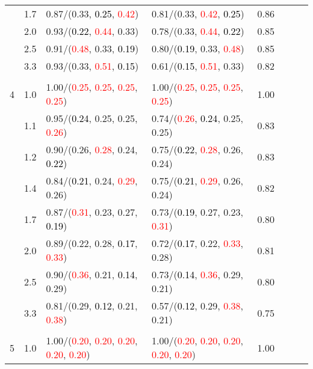 \documentclass[10pt,a4paper]{report}
\begin{document}
\begin{table}[!htbp]
\begin{center}
{\begin{tabular}{ccllcccc}
			&1.7&0.87/(0.33, \textcolor{black}{0.25}, \textcolor{red}{0.42})&0.81/(0.33, \textcolor{red}{0.42}, \textcolor{black}{0.25})&0.86\\
			&2.0&0.93/(\textcolor{black}{0.22}, \textcolor{red}{0.44}, 0.33)&0.78/(0.33, \textcolor{red}{0.44}, \textcolor{black}{0.22})&0.85\\
			&2.5&0.91/(\textcolor{red}{0.48}, 0.33, \textcolor{black}{0.19})&0.80/(\textcolor{black}{0.19}, 0.33, \textcolor{red}{0.48})&0.85\\
			&3.3&0.93/(0.33, \textcolor{red}{0.51}, \textcolor{black}{0.15})&0.61/(\textcolor{black}{0.15}, \textcolor{red}{0.51}, 0.33)&0.82\\
			&&&&\\
			4			&1.0&1.00/(\textcolor{red}{0.25}, \textcolor{red}{0.25}, \textcolor{red}{0.25}, \textcolor{red}{0.25})&1.00/(\textcolor{red}{0.25}, \textcolor{red}{0.25}, \textcolor{red}{0.25}, \textcolor{red}{0.25})&1.00\\
			&1.1&0.95/(\textcolor{black}{0.24}, 0.25, 0.25, \textcolor{red}{0.26})&0.74/(\textcolor{red}{0.26}, \textcolor{black}{0.24}, 0.25, 0.25)&0.83\\
			&1.2&0.90/(0.26, \textcolor{red}{0.28}, 0.24, \textcolor{black}{0.22})&0.75/(\textcolor{black}{0.22}, \textcolor{red}{0.28}, 0.26, 0.24)&0.83\\
			&1.4&0.84/(\textcolor{black}{0.21}, 0.24, \textcolor{red}{0.29}, 0.26)&0.75/(\textcolor{black}{0.21}, \textcolor{red}{0.29}, 0.26, 0.24)&0.82\\
			&1.7&0.87/(\textcolor{red}{0.31}, 0.23, 0.27, \textcolor{black}{0.19})&0.73/(\textcolor{black}{0.19}, 0.27, 0.23, \textcolor{red}{0.31})&0.80\\
			&2.0&0.89/(0.22, 0.28, \textcolor{black}{0.17}, \textcolor{red}{0.33})&0.72/(\textcolor{black}{0.17}, 0.22, \textcolor{red}{0.33}, 0.28)&0.81\\
			&2.5&0.90/(\textcolor{red}{0.36}, 0.21, \textcolor{black}{0.14}, 0.29)&0.73/(\textcolor{black}{0.14}, \textcolor{red}{0.36}, 0.29, 0.21)&0.80\\
			&3.3&0.81/(0.29, \textcolor{black}{0.12}, 0.21, \textcolor{red}{0.38})&0.57/(\textcolor{black}{0.12}, 0.29, \textcolor{red}{0.38}, 0.21)&0.75\\
			&&&&\\
			5			&1.0&1.00/(\textcolor{red}{0.20}, \textcolor{red}{0.20}, \textcolor{red}{0.20}, \textcolor{red}{0.20}, \textcolor{red}{0.20})&1.00/(\textcolor{red}{0.20}, \textcolor{red}{0.20}, \textcolor{red}{0.20}, \textcolor{red}{0.20}, \textcolor{red}{0.20})&1.00\\

\end{tabular}}
\end{center}
\end{table}
\end{document}
